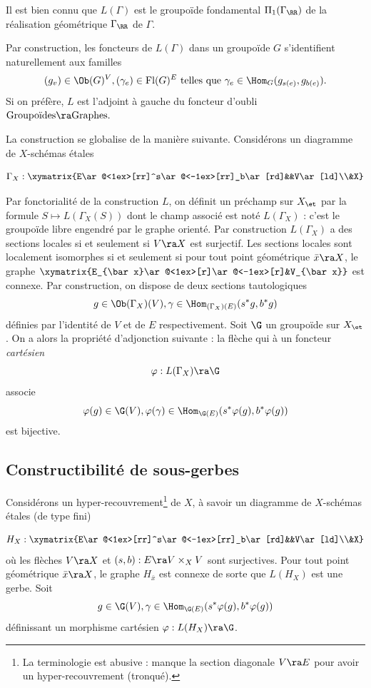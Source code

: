 \documentclass[10pt]{../fichiers-configuration-latex/smfart}
\begin{document}
\begin{remarque2} Il est bien connu que  $L(\Gamma)$ est le groupoïde fondamental
$\Pi_1(\Gamma_\RR)$ de la réalisation géométrique $\Gamma_\RR$ de $\Gamma$.\end{remarque2}

Par construction, les foncteurs de $L(\Gamma)$ dans un groupoïde $G$ s'identifient naturellement aux
familles $$(g_v)\in \Ob(G)^V, (\gamma_e)\in\mathrm{Fl}(G)^E\text{ telles que }\gamma_e\in
\Hom_G(g_{s(e)},g_{b(e)}).$$ Si on préfère, $L$ est l'adjoint à gauche du foncteur d'oubli
$\text{Groupoïdes}\ra\text{Graphes}.$

La construction se globalise de la manière suivante. Considérons un diagramme de $X$-schémas étales

$$\Gamma_X:\xymatrix{E\ar@<1ex>[rr]^s\ar@<-1ex>[rr]_b\ar[rd]&&V\ar[ld]\\&X}$$

Par fonctorialité de la construction $L$, on définit un préchamp sur $X_\et$ par la formule
$S\mapsto L(\Gamma_X(S))$ dont le champ associé est noté $L(\Gamma_X)$ : c'est le groupoïde libre
engendré par le graphe orienté. Par construction $L(\Gamma_X)$ a des sections locales si et
seulement si $V\ra X$ est surjectif. Les sections locales sont localement isomorphes si et seulement
si pour tout point géométrique $\bar x\ra X$, le graphe  $\xymatrix{E_{\bar
x}\ar@<1ex>[r]\ar@<-1ex>[r]&V_{\bar x}}$ est connexe. Par construction, on dispose de deux sections
tautologiques $$g\in \Ob(\Gamma_X)(V),\gamma\in\Hom_{(\Gamma_X)(E)}(s^*g,b^*g)$$  définies par
l'identité de $V$ et de $E$ respectivement. Soit $\G$ un groupoïde sur $X_\et$. On a alors la
propriété d'adjonction suivante : la flèche qui à un foncteur \emph{cartésien}
$$\varphi:L(\Gamma_X)\ra\G$$ associe
$$\varphi(g)\in\G(V),\varphi(\gamma)\in\Hom_{\G(E)}(s^*\varphi(g),b^*\varphi(g))$$ est bijective.



\subsection{Constructibilité de sous-gerbes} Considérons un hyper-recouvrement\footnote{La
terminologie est abusive : manque la section diagonale $V\ra E$ pour avoir un hyper-recouvrement
(tronqué).} de $X$, à savoir un diagramme de $X$-schémas étales (de type fini)

$$H_X:\xymatrix{E\ar@<1ex>[rr]^s\ar@<-1ex>[rr]_b\ar[rd]&&V\ar[ld]\\&X}$$ où les flèches $V\ra X$ et
$(s,b):E\ra V\times_XV$ sont surjectives. Pour tout point géométrique $\bar x\ra X$, le graphe
$H_{\bar x}$ est connexe de sorte que $L(H_X)$ est une gerbe. Soit $$g\in
\G(V),\gamma\in\Hom_{\G(E)}(s^*\varphi(g),b^*\varphi(g))$$ définissant un morphisme cartésien
$\varphi :L(H_X)\ra\G$.
\end{document}

